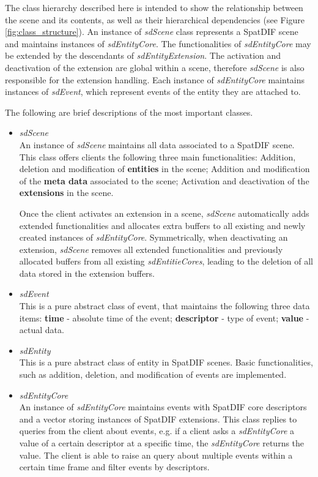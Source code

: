 \documentclass{article}
\begin{document}
The class hierarchy described here is intended to show the relationship between the scene and its contents, as well as their hierarchical dependencies (see Figure \ref{fig:class_structure}). 
An instance of \emph{sdScene} class represents a SpatDIF scene and maintains instances of \emph{sdEntityCore}. The functionalities of \emph{sdEntityCore} may be extended by the descendants of \emph{sdEntityExtension}. 
The activation and deactivation of the extension are global within a scene, therefore \emph{sdScene} is also responsible for the extension handling.
Each instance of \emph{sdEntityCore} maintains instances of \emph{sdEvent}, which represent events of the entity they are attached to.

The following are brief descriptions of the most important classes.

\begin{itemize}[leftmargin=-0.0mm]
\item[] \emph{sdScene}\\
An instance of \emph{sdScene} maintains all data associated to a SpatDIF scene. This class offers clients the following three main functionalities: Addition, deletion and modification of \textbf{entities} in the scene; Addition and modification of the \textbf{meta data} associated to the scene; Activation and deactivation of the \textbf{extensions} in the scene.

Once the client activates an extension in a scene, \emph{sdScene} automatically adds extended functionalities and allocates extra buffers to all existing and newly created instances of \emph{sdEntityCore}. 
Symmetrically, when deactivating an extension, \emph{sdScene} removes all extended functionalities and previously allocated buffers from all existing \emph{sdEntitieCores}, leading to the deletion of all data stored in the extension buffers.

\item[] \emph{sdEvent}\\
This is a pure abstract class of event, that maintains the following three data items: \textbf{time} - absolute time of the event; \textbf{descriptor} - type of event; \textbf{value} - actual data.

\item[] \emph{sdEntity}\\
This is a pure abstract class of entity in SpatDIF scenes. Basic functionalities, such as addition, deletion, and modification of events are implemented.

\item[] \emph{sdEntityCore}\\
An instance of \emph{sdEntityCore} maintains events with SpatDIF core descriptors and a vector storing instances of SpatDIF extensions. 
This class replies to queries from the client about events, e.g. if a client asks a \emph{sdEntityCore} a value of a certain descriptor at a specific time, the \emph{sdEntityCore} returns the value. 
The client is able to raise an query about multiple events within a certain time frame and filter events by descriptors. 


\end{itemize}
\end{document}
